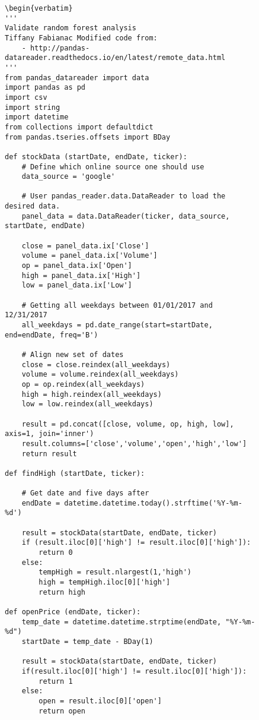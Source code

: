 \documentclass[sigconf]{acmart}
\begin{document}
\begin{figure}[htb]
\begin{lstlisting}
\begin{verbatim}
'''
Validate random forest analysis
Tiffany Fabianac Modified code from:
    - http://pandas-datareader.readthedocs.io/en/latest/remote_data.html
'''
from pandas_datareader import data
import pandas as pd
import csv
import string
import datetime
from collections import defaultdict
from pandas.tseries.offsets import BDay

def stockData (startDate, endDate, ticker):
	# Define which online source one should use
	data_source = 'google'

	# User pandas_reader.data.DataReader to load the desired data.
	panel_data = data.DataReader(ticker, data_source, startDate, endDate)

	close = panel_data.ix['Close']
	volume = panel_data.ix['Volume']
	op = panel_data.ix['Open']
	high = panel_data.ix['High']
	low = panel_data.ix['Low']

	# Getting all weekdays between 01/01/2017 and 12/31/2017
	all_weekdays = pd.date_range(start=startDate, end=endDate, freq='B')

	# Align new set of dates
	close = close.reindex(all_weekdays)
	volume = volume.reindex(all_weekdays)
	op = op.reindex(all_weekdays)
	high = high.reindex(all_weekdays)
	low = low.reindex(all_weekdays)

	result = pd.concat([close, volume, op, high, low], axis=1, join='inner')
	result.columns=['close','volume','open','high','low']
	return result
   
def findHigh (startDate, ticker):

	# Get date and five days after
	endDate = datetime.datetime.today().strftime('%Y-%m-%d')

	result = stockData(startDate, endDate, ticker)
	if (result.iloc[0]['high'] != result.iloc[0]['high']):
		return 0
	else:
		tempHigh = result.nlargest(1,'high')
		high = tempHigh.iloc[0]['high']
		return high

def openPrice (endDate, ticker):
	temp_date = datetime.datetime.strptime(endDate, "%Y-%m-%d")
	startDate = temp_date - BDay(1)

	result = stockData(startDate, endDate, ticker)
	if(result.iloc[0]['high'] != result.iloc[0]['high']):
		return 1
	else:
		open = result.iloc[0]['open']
		return open


\end{lstlisting}
\end{figure}
\end{document}
